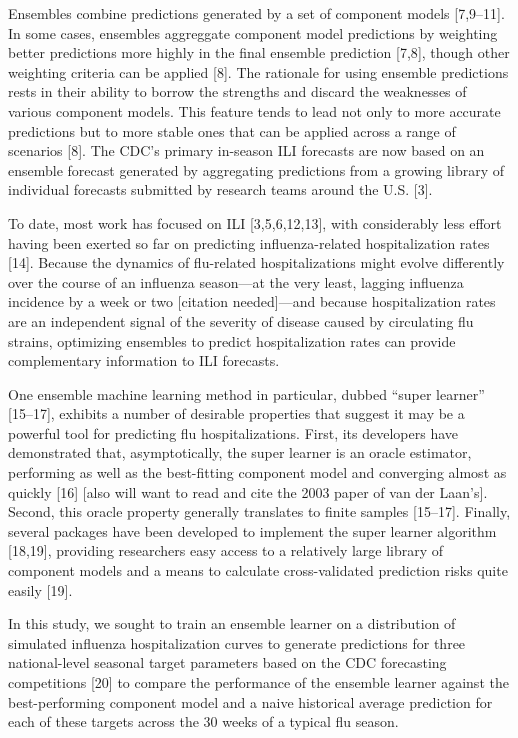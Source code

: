 \documentclass[10pt,letterpaper]{article}
\begin{document}
Ensembles combine predictions generated by a set of component models
{[}7,9--11{]}. In some cases, ensembles aggreggate component model
predictions by weighting better predictions more highly in the final
ensemble prediction {[}7,8{]}, though other weighting criteria can be
applied {[}8{]}. The rationale for using ensemble predictions rests in
their ability to borrow the strengths and discard the weaknesses of
various component models. This feature tends to lead not only to more
accurate predictions but to more stable ones that can be applied across
a range of scenarios {[}8{]}. The CDC's primary in-season ILI forecasts
are now based on an ensemble forecast generated by aggregating
predictions from a growing library of individual forecasts submitted by
research teams around the U.S. {[}3{]}.

To date, most work has focused on ILI {[}3,5,6,12,13{]}, with
considerably less effort having been exerted so far on predicting
influenza-related hospitalization rates {[}14{]}. Because the dynamics
of flu-related hospitalizations might evolve differently over the course
of an influenza season---at the very least, lagging influenza incidence
by a week or two {[}citation needed{]}---and because hospitalization
rates are an independent signal of the severity of disease caused by
circulating flu strains, optimizing ensembles to predict hospitalization
rates can provide complementary information to ILI forecasts.

One ensemble machine learning method in particular, dubbed ``super
learner'' {[}15--17{]}, exhibits a number of desirable properties that
suggest it may be a powerful tool for predicting flu hospitalizations.
First, its developers have demonstrated that, asymptotically, the super
learner is an oracle estimator, performing as well as the best-fitting
component model and converging almost as quickly {[}16{]} {[}also will
want to read and cite the 2003 paper of van der Laan's{]}. Second, this
oracle property generally translates to finite samples {[}15--17{]}.
Finally, several packages have been developed to implement the super
learner algorithm {[}18,19{]}, providing researchers easy access to a
relatively large library of component models and a means to calculate
cross-validated prediction risks quite easily {[}19{]}.

In this study, we sought to train an ensemble learner on a distribution
of simulated influenza hospitalization curves to generate predictions
for three national-level seasonal target parameters based on the CDC
forecasting competitions {[}20{]} to compare the performance of the
ensemble learner against the best-performing component model and a naive
historical average prediction for each of these targets across the 30
weeks of a typical flu season.
\end{document}
